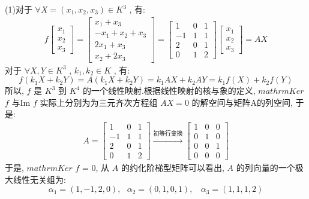 \documentclass[11pt,a4paper,openany,oneside]{book}
\begin{document}
(1)对于 $ \forall X = (x_1, x_2, x_3) \in K^3 $ , 有:
\begin{gather*}
f
\begin{bmatrix}
x_1 \\ x_2 \\ x_3 
\end{bmatrix}
=
\begin{bmatrix}
x_1+x_3 \\
-x_1 + x_2 + x_3 \\
2x_1 + x_3 \\
x_2 + 2x_3
\end{bmatrix}
=
\begin{bmatrix}
1  &  0  &  1  \\
-1 &  1  &  1  \\
2  &  0  &  1  \\
0  &  1  &  2
\end{bmatrix}
\begin{bmatrix}
x_1 \\ x_2  \\ x_3 
\end{bmatrix}
=AX
\end{gather*}
对于 $ \forall X, Y \in K^3 $ ,  $ k_1, k_2 \in K $ , 有:
 $$  f(k_1X + k_2Y) = A(k_1X+k_2Y) = k_1AX + k_2AY = k_1f(X) + k_2f(Y)   $$ 
所以,  $ f $ 是 $ K^3 $ 到 $ K^4 $ 的一个线性映射.根据线性映射的核与象的定义,  $mathrm{Ker}$  $ f $ 与Im $ f $ 实际上分别为为三元齐次方程组 $ AX=0 $ 的解空间与矩阵A的列空间, 于是:
\begin{gather*}
A=
\begin{bmatrix}
1  &  0  &  1  \\
-1 &  1  &  1  \\
2  &  0  &  1  \\
0  &  1  &  2
\end{bmatrix}
\xrightarrow{\text{初等行变换}}
\begin{bmatrix}
1 & 0 & 0 \\
0 & 1 & 0 \\
0 & 0 & 1  \\
0 & 0 & 0
\end{bmatrix}
\end{gather*}
于是,  $mathrm{Ker}$  $ f $  = {0}, 从 $ A $ 的约化阶梯型矩阵可以看出,  $ A $ 的列向量的一个极大线性无关组为:
 $$  \alpha_1 = (1, -1, 2, 0), \ \ \ \alpha_2 =(0,1,0,1), \ \ \ \ \alpha_3=(1,1,1,2)  $$  
\end{document}
